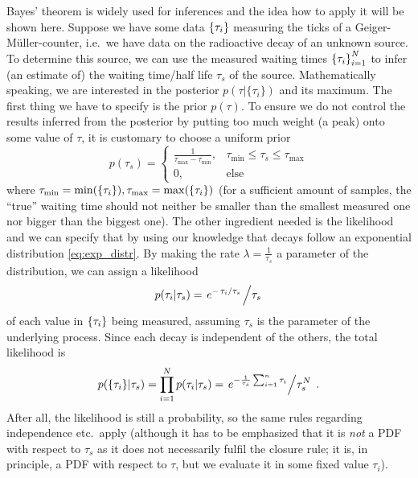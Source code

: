 \begin{ex}
Bayes' theorem is widely used for inferences and the idea how to apply it will be shown here. Suppose we have some data $\qty{\tau_i}$ measuring the ticks of a Geiger-Müller-counter, i.e.~we have data on the radioactive decay of an unknown source. To determine this source, we can use the measured waiting times $\qty{\tau_i}_{i = 1}^N$ to infer (an estimate of) the waiting time/half life $\tau_s$ of the source. Mathematically speaking, we are interested in the posterior $p(\tau | \{\tau_i\})$ and its maximum. The first thing we have to specify is the prior $p(\tau)$. To ensure we do not control the results inferred from the posterior by putting too much weight (a peak) onto some value of $\tau$, it is customary to choose a uniform prior
\begin{equation*}
p(\tau_s) = \begin{cases} \frac{1}{\tau_\text{max} - \tau_\text{min}}, & \tau_\text{min} \leq \tau_s \leq \tau_\text{max} \\ 0, & \text{else} \end{cases}
\end{equation*}
where $\tau_\text{min} = \min(\qty{\tau_i}), \tau_\text{max} = \max(\qty{\tau_i})$ (for a sufficient amount of samples, the \enquote{true} waiting time should not neither be smaller than the smallest measured one nor bigger than the biggest one). The other ingredient needed is the likelihood and we can specify that by using our knowledge that decays follow an exponential distribution \eqref{eq:exp_distr}. By making the rate $\lambda = \frac{1}{\tau_s}$ a parameter of the distribution, we can assign a likelihood
\begin{equation*}
p(\tau_i | \tau_s) = \flatfrac{e^{- \flatfrac{\tau_i}{\tau_s}}}{\tau_s}
\end{equation*}
of each value in $\qty{\tau_i}$ being measured, assuming $\tau_s$ is the parameter of the underlying process. Since each decay is independent of the others, the total likelihood is
\begin{equation*}
p(\{\tau_i\} | \tau_s) = \prod_{i = 1}^N p(\tau_i | \tau_s) = \flatfrac{e^{- \frac{1}{\tau_s} \sum_{i = 1}^n \tau_i}}{\tau_s^N} \, .
\end{equation*}
After all, the likelihood is still a probability, so the same rules regarding independence etc.~apply (although it has to be emphasized that it is \emph{not} a PDF with respect to $\tau_s$ as it does not necessarily fulfil the closure rule; it is, in principle, a PDF with respect to $\tau$, but we evaluate it in some fixed value $\tau_i$).


\end{ex}

